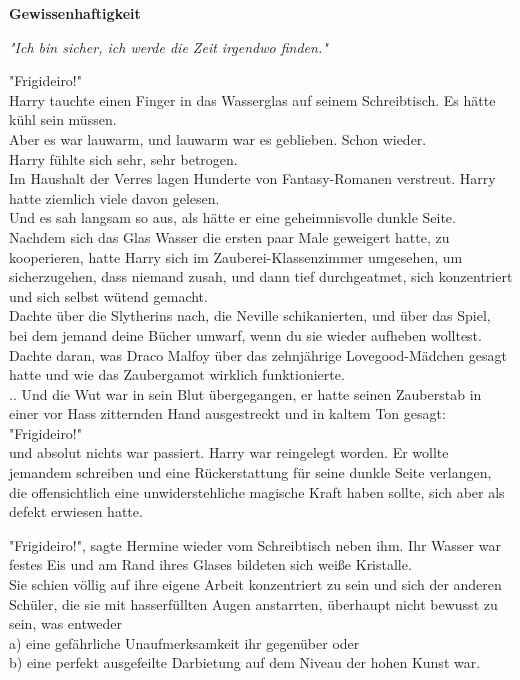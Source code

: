 

\hypertarget{gewissenhaftigkeit}{%

\textbf{Gewissenhaftigkeit}

\emph{"Ich bin sicher, ich werde die Zeit irgendwo finden."}

"Frigideiro!"\\ Harry tauchte einen Finger in das Wasserglas auf seinem Schreibtisch. Es hätte kühl sein müssen.\\ Aber es war lauwarm, und lauwarm war es geblieben. Schon wieder.\\ Harry fühlte sich sehr, sehr betrogen.\\ Im Haushalt der Verres lagen Hunderte von Fantasy-Romanen verstreut. Harry hatte ziemlich viele davon gelesen.\\ Und es sah langsam so aus, als hätte er eine geheimnisvolle dunkle Seite. Nachdem sich das Glas Wasser die ersten paar Male geweigert hatte, zu kooperieren, hatte Harry sich im Zauberei-Klassenzimmer umgesehen, um sicherzugehen, dass niemand zusah, und dann tief durchgeatmet, sich konzentriert und sich selbst wütend gemacht.\\ Dachte über die Slytherins nach, die Neville schikanierten, und über das Spiel, bei dem jemand deine Bücher umwarf, wenn du sie wieder aufheben wolltest.\\ Dachte daran, was Draco Malfoy über das zehnjährige Lovegood-Mädchen gesagt hatte und wie das Zaubergamot wirklich funktionierte.\\ .. Und die Wut war in sein Blut übergegangen, er hatte seinen Zauberstab in einer vor Hass zitternden Hand ausgestreckt und in kaltem Ton gesagt:\\ "Frigideiro!"\\ und absolut nichts war passiert. Harry war reingelegt worden. Er wollte jemandem schreiben und eine Rückerstattung für seine dunkle Seite verlangen, die offensichtlich eine unwiderstehliche magische Kraft haben sollte, sich aber als defekt erwiesen hatte.

"Frigideiro!", sagte Hermine wieder vom Schreibtisch neben ihm. Ihr Wasser war festes Eis und am Rand ihres Glases bildeten sich weiße Kristalle.\\ Sie schien völlig auf ihre eigene Arbeit konzentriert zu sein und sich der anderen Schüler, die sie mit hasserfüllten Augen anstarrten, überhaupt nicht bewusst zu sein, was entweder\\ a) eine gefährliche Unaufmerksamkeit ihr gegenüber oder\\ b) eine perfekt ausgefeilte Darbietung auf dem Niveau der hohen Kunst war.

}
